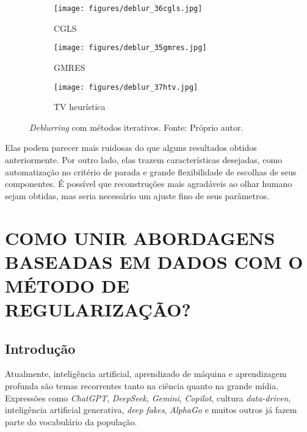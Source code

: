 \begin{figure}[H]
     \centering
     \begin{subfigure}[b]{0.32\textwidth}
         \centering
                  \texttt{[image: figures/deblur\_36cgls.jpg]}
         \caption{CGLS}
         \label{fig:01hybridb}
     \end{subfigure}
     \hfill
          \begin{subfigure}[b]{0.32\textwidth}
         \centering
         \texttt{[image: figures/deblur\_35gmres.jpg]}
         \caption{GMRES}
         \label{fig:01hybrida}
     \end{subfigure}
          \hfill
     \begin{subfigure}[b]{0.32\textwidth}
         \centering
                  \texttt{[image: figures/deblur\_37htv.jpg]}
         \caption{TV heurística}
         \label{fig:01hybridc}
     \end{subfigure}
\caption[\textit{Deblurring} com métodos iterativos.]{\textit{Deblurring} com métodos iterativos. Fonte: Próprio autor.}
\label{fig:01hybrid}
\end{figure}
Elas podem parecer mais ruidosas do que alguns resultados obtidos anteriormente. Por outro lado, elas trazem características desejadas, como automatização no critério de parada e grande flexibilidade de escolhas de seus componentes. É possível que reconstruções mais agradáveis ao olhar humano sejam obtidas, mas seria necessário um ajuste fino de seus parâmetros.


\newpage
\section{COMO UNIR ABORDAGENS BASEADAS EM DADOS COM O MÉTODO DE REGULARIZAÇÃO?}\label{sec:integrated}


\subsection{Introdução}\label{sec:deeplearning}

Atualmente, inteligência artificial, aprendizado de máquina e aprendizagem profunda são temas recorrentes tanto na ciência quanto na grande mídia. Expressões como \textit{ChatGPT}, \textit{DeepSeek}, \textit{Gemini}, \textit{Copilot}, cultura \textit{data-driven}, inteligência artificial generativa, \textit{deep fakes}, \textit{AlphaGo} e muitos outros já fazem parte do vocabulário da população. 

